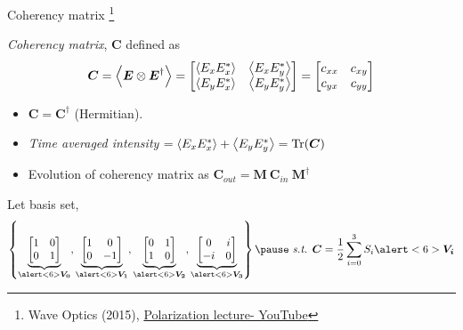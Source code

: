 \documentclass[12pt, dvipsnames]{beamer}
\numberwithin{equation}{section}
\newcommand\blfootnote[1]{%
	\begingroup
	\renewcommand\thefootnote{}\footnote{#1}%
	\addtocounter{footnote}{-1}%
	\endgroup
}
\begin{document}
\begin{frame}{Coherency matrix}\blfootnote{Wave Optics (2015), \href{https://www.youtube.com/watch?v=RowMxWt4mVE&list=LL&index=5}{Polarization lecture- YouTube}}
	\textit{Coherency matrix}, $\boldsymbol{C}$ defined as 
	\begin{align*}
		\boldsymbol{C}=
		\expval{\boldsymbol{E}\otimes\boldsymbol{E}^\dagger}=
			\begin{bmatrix}
				\expval{E_xE_x^\ast} & \expval{E_xE_y^\ast}\\
				\expval{E_yE_x^\ast} & \expval{E_yE_y^\ast}
			\end{bmatrix}=
		\begin{bmatrix}
			c_{xx} & c_{xy}\\
			c_{yx} & c_{yy}
		\end{bmatrix}
	\end{align*}\pause
	\begin{itemize}
		\item
		$\boldsymbol{C}=\boldsymbol{C}^\dagger$ (\alert<2>{Hermitian}).\pause
		
		\item 
		\textit{Time averaged intensity} $=\expval{E_xE_x^\ast}+\expval{E_yE_y^\ast}=\Tr(\boldsymbol{C})$\pause
		
		\item \alert<4>{Evolution of coherency matrix as 
		$\boldsymbol{C}_{out} =  \boldsymbol{M}\:\boldsymbol{C}_{in}\:\boldsymbol{M}^\dagger$} 
	\end{itemize}\pause

	Let basis set, 
	$$\left\{
	\underbrace{\begin{bmatrix}1 & 0 \\ 0 & 1\\\end{bmatrix}}_{\alert<6>{\boldsymbol{V_0}}},
	\underbrace{\begin{bmatrix}1 & 0 \\ 0 & -1\\\end{bmatrix}}_{\alert<6>{\boldsymbol{V_1}}},
	\underbrace{\begin{bmatrix}0 & 1 \\ 1 & 0\\\end{bmatrix}}_{\alert<6>{\boldsymbol{V_2}}},
	\underbrace{\begin{bmatrix}0 & i \\ -i & 0\\\end{bmatrix}}_{\alert<6>{\boldsymbol{V_3}}}
	\right\}\pause \text{ \textit{s.t.} } \boldsymbol{C} = \frac{1}{2} \sum_{i=0}^{3} S_i \alert<6>{\boldsymbol{V_i}}$$
\end{frame}
\end{document}
